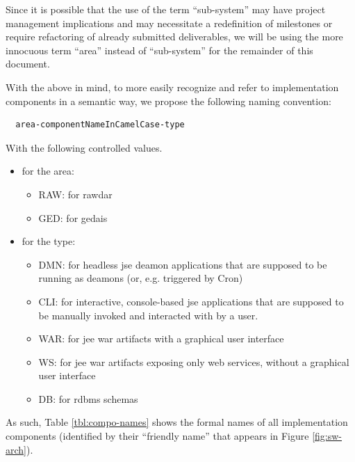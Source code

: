 \documentclass[9pt,twoside,openright,a4paper,pagesize]{report}
\begin{document}
  Since it is possible that the use of the term ``sub-system'' may have project management
  implications and may necessitate a redefinition of milestones or require
  refactoring of already submitted deliverables, we will be using the more innocuous term
  ``area'' instead of ``sub-system'' for the remainder of this document.

  With the above in mind, to more easily recognize and refer to implementation components
  in a semantic way, we propose the following naming convention:
\begin{verbatim}
  area-componentNameInCamelCase-type
\end{verbatim}

With the following controlled values.
\begin{itemize}
\item for the area:
  \begin{itemize}
  \item RAW: for \gls{rawdar}
  \item GED: for \gls{gedais}
  \end{itemize}
\item for the type:
  \begin{itemize}
  \item DMN: for headless \gls{jse} deamon applications that are supposed to be running as deamons (or, e.g. triggered
    by Cron)
  \item CLI: for interactive, console-based \gls{jse} applications that are supposed to be manually invoked and interacted
    with by a user.
  \item WAR: for \gls{jee} \gls{war} artifacts with a graphical user interface
  \item WS: for \gls{jee} \gls{war} artifacts exposing only web services, without a graphical user interface
  \item DB: for \gls{rdbms} schemas
  \end{itemize}
\end{itemize}

As such, Table \ref{tbl:compo-names} shows the formal names of all implementation components
(identified by their ``friendly name''
that appears in Figure \ref{fig:sw-arch}).
\end{document}
